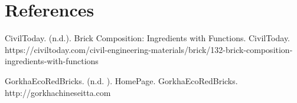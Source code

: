 \section{References}
\setlength{\parindent}{0pt}
\vspace{1em}

CivilToday. (n.d.). Brick Composition: Ingredients with Functions. CivilToday. \\
https://civiltoday.com/civil-engineering-materials/brick/132-brick-composition-ingredients-with-functions

\vspace{1em}
GorkhaEcoRedBricks. (n.d. ). HomePage. GorkhaEcoRedBricks. \\
http://gorkhachineseitta.com